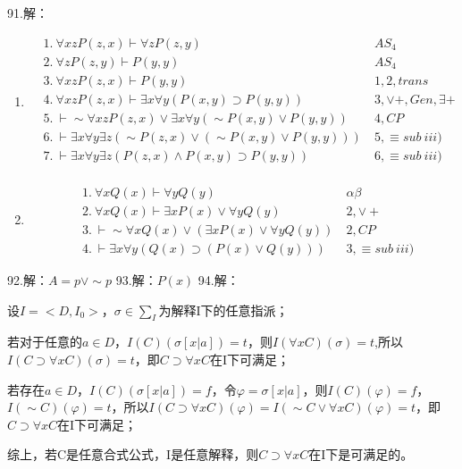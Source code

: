 \documentclass[a4paper]{ctexart}
\begin{document}
\noindent 91.解：
\begin{enumerate}
  \item 
  \begin{align*}
    &1.\ \forall{xz}P(z,x)\vdash\forall{z}P(z,y) \ &AS_4 \\
    &2.\ \forall{z}P(z,y)\vdash P(y,y) \ &AS_4 \\
    &3.\ \forall{xz}P(z,x)\vdash P(y,y) \ &1,2,trans\\
    &4.\ \forall{xz}P(z,x)\vdash\exists{x}\forall{y}(P(x,y)\supset P(y,y)) \ &3,\vee+,Gen,\exists +\\
    &5.\ \vdash \sim\forall{xz}P(z,x)\vee\exists{x}\forall{y}(\sim P(x,y)\vee P(y,y)) \ &4,CP\\
    &6.\ \vdash \exists{x}\forall{y}\exists{z}(\sim P(z,x)\vee(\sim P(x,y)\vee P(y,y))) \ &5,\equiv sub\ iii) \\
    &7.\ \vdash \exists{x}\forall{y}\exists{z}(P(z,x)\wedge P(x,y)\supset P(y,y)) \ &6,\equiv sub\ iii)\\
  \end{align*}
  \item 
  \begin{align*}
    &1.\ \forall{x}Q(x)\vdash \forall{y}Q(y) \ &\alpha\beta\\
    &2.\ \forall{x}Q(x)\vdash \exists{x}P(x)\vee\forall{y}Q(y) \ &2,\vee+\\
    &3.\ \vdash\sim\forall{x}Q(x)\vee(\exists{x}P(x)\vee\forall{y}Q(y)) \ &2,CP\\
    &4.\ \vdash\exists{x}\forall{y}(Q(x)\supset(P(x)\vee Q(y)))\ &3,\equiv sub\ iii)
  \end{align*}
\end{enumerate}

\noindent 92.解：$A=p\vee\sim p$
\noindent 93.解：$P(x)$
\noindent 94.解：

设$I=<D,I_0>$，$\sigma\in\sum_I$为解释I下的任意指派；

若对于任意的$a\in D$，$I(C)(\sigma[x|a])=t$，则$I(\forall{x}C)(\sigma)=t$,所以$I(C\supset\forall{x}C)(\sigma)=t$，即$C\supset\forall{x}C$在I下可满足；

若存在$a\in D$，$I(C)(\sigma[x|a])=f$，令$\varphi=\sigma[x|a]$，则$I(C)(\varphi)=f$，$I(\sim C)(\varphi)=t$，所以$I(C\supset\forall{x}C)(\varphi)=I(\sim C\vee\forall{x}C)(\varphi)=t$，即$C\supset\forall{x}C$在I下可满足；

综上，若C是任意合式公式，I是任意解释，则$C\supset\forall{x}C$在I下是可满足的。\newline
\end{document}
